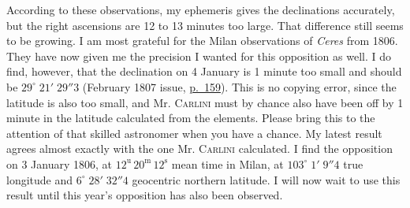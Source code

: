 \par\indent According to these observations, my ephemeris gives the declinations accurately, but the right ascensions are 12 to 13 minutes too large. That difference still seems to be growing. I am most grateful for the Milan observations of \emph{Ceres} from 1806. They have now given me the precision I wanted for this opposition as well. I do find, however, that the declination on 4 January is 1 minute too small and should be $29^\circ\;21'\;29''3$ (February 1807 issue, \href{https://archive.org/details/bub_gb_sKAAAAAAMAAJ/page/n164/mode/1up}{p.~159}). This is no copying error, since the latitude is also too small, and Mr. \textsc{Carlini} must by chance also have been off by 1 minute in the latitude calculated from the elements. Please bring this to the attention of that skilled astronomer when you have a chance. My latest result agrees almost exactly with the one Mr. \textsc{Carlini} calculated. I find the opposition on 3 January 1806, at $12^{\mathrm u}\,20^{\mathrm m}\,12^{\mathrm s}$ mean time in Milan, at $103^\circ\;1'\;9''4$ true longitude and $6^\circ\;28'\;32''4$ geocentric northern latitude. I will now wait to use this result until this year’s opposition has also been observed.

